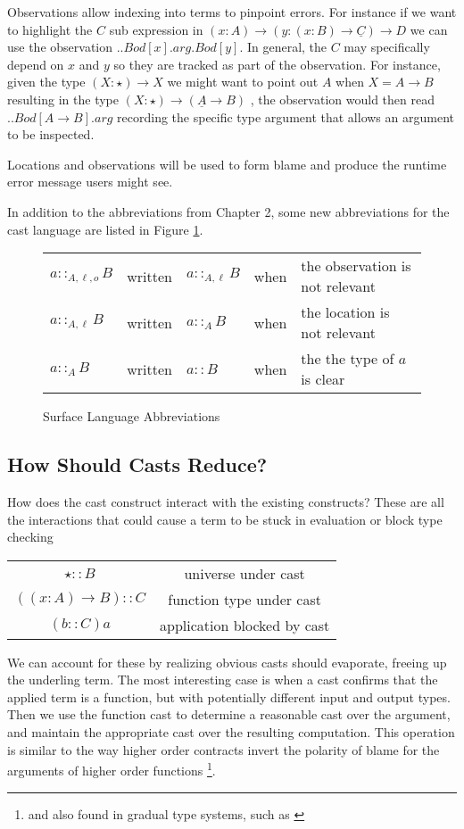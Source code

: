 Observations allow indexing into terms to pinpoint errors. For instance
if we want to highlight the $C$ sub expression in $\left(x:A\right)\rightarrow\left(y:\left(x:B\right)\rightarrow\underline{C}\right)\rightarrow D$
we can use the observation $..Bod[x].arg.Bod[y]$. In general, the
$C$ may specifically depend on $x$ and $y$ so they are tracked
as part of the observation. For instance, given the type $\left(X:\star\right)\rightarrow X$
we might want to point out $A$ when $X=A\rightarrow B$ resulting
in the type $\left(X:\star\right)\rightarrow\left(\underline{A}\rightarrow B\right)$
, the observation would then read $..Bod[A\rightarrow B].arg$ recording
the specific type argument that allows an argument to be inspected.

Locations and observations will be used to form blame and produce
the runtime error message users might see.

In addition to the abbreviations from Chapter 2, some new abbreviations
for the cast language are listed in Figure \ref{fig:cast-pre-syntax-abrev}.
\begin{figure}
\begin{tabular}{lclll}
$a::_{A,\ensuremath{\ell},o}B$ & written & $a::_{A,\ensuremath{\ell}}B$ & when & the observation is not relevant\tabularnewline
$a::_{A,\ensuremath{\ell}}B$ & written & $a::_{A}B$ & when & the location is not relevant\tabularnewline
$a::_{A}B$ & written & $a::B$ & when & the the type of $a$is clear\tabularnewline
\end{tabular}

\caption{Surface Language Abbreviations}
\label{fig:cast-pre-syntax-abrev}
\end{figure}


\subsection{How Should Casts Reduce?}

How does the cast construct interact with the existing constructs?
These are all the interactions that could cause a term to be stuck
in evaluation or block type checking

\begin{tabular}{cc}
$\star::B$ & universe under cast\tabularnewline
$\left(\left(x:A\right)\rightarrow B\right)::C$ & function type under cast\tabularnewline
$\left(b::C\right)a$ & application blocked by cast\tabularnewline
\end{tabular}

We can account for these by realizing obvious casts should evaporate,
freeing up the underling term. The most interesting case is when a
cast confirms that the applied term is a function, but with potentially
different input and output types. Then we use the function cast to
determine a reasonable cast over the argument, and maintain the appropriate
cast over the resulting computation. This operation is similar to
the way higher order contracts invert the polarity of blame for the
arguments of higher order functions \cite{10.1145/581478.581484}
\footnote{and also found in gradual type systems, such as \cite{10.1007/978-3-642-00590-9_1}}.

